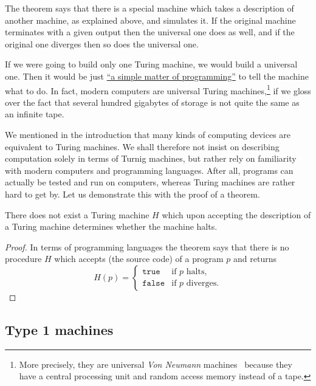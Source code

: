 \noindent
The theorem says that there is a special machine which takes a
description of another machine, as explained above, and simulates it.
If the original machine terminates with a given output then the
universal one does as well, and if the original one diverges then so
does the universal one.

If we were going to build only one Turing machine, we would build a
universal one. Then it would be just
\href{http://www.catb.org/jargon/html/S/SMOP.html}{``a simple matter
  of programming''} to tell the machine what to do. In fact, modern
computers are universal Turing machines,\footnote{More precisely, they
  are universal \emph{Von Neumann} machines~\cite{} because they have
  a central processing unit and random access memory instead of a
  tape.} if we gloss over the fact that several hundred gigabytes of
storage is not quite the same as an infinite tape.

We mentioned in the introduction that many kinds of computing devices
are equivalent to Turing machines. We shall therefore not insist on
describing computation solely in terms of Turnig machines, but rather
rely on familiarity with modern computers and programming languages.
After all, programs can actually be tested and run on computers,
whereas Turing machines are rather hard to get by. Let us demonstrate
this with the proof of a theorem.

\begin{theorem}
  There does not exist a Turing machine $H$ which upon accepting the
  description of a Turing machine determines whether the machine
  halts.
\end{theorem}

\begin{proof}
  In terms of programming languages the theorem says that there is no
  procedure $H$ which accepts (the source code) of a program $p$ and
  returns
  \begin{equation*}
    H(p) =
    \begin{cases}
      \mathtt{true} & \text{if $p$ halts,}\\
      \mathtt{false} & \text{if $p$ diverges.}
    \end{cases}
  \end{equation*}
\end{proof}


\subsection{Type 1 machines}
\label{sec:type-1}

